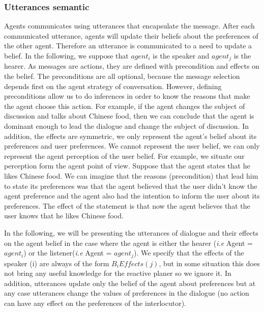 \documentclass{llncs}
\begin{document}

\subsubsection{Utterances semantic}
Agents communicates using utterances that encapsulate the message. After each communicated utterance, agents will update their beliefs about the preferences of the other agent. Therefore an utterance is communicated to a need to update a belief. In the following, we suppose that $agent_{i}$ is the speaker and $agent_{j}$ is the hearer. As messages are actions, they are defined with precondition and effects on the belief. The preconditions are all optional, because the message selection depends first on the agent strategy of conversation. However, defining preconditions allow us to do inferences in order to know the reasons that make the agent choose this action. For example, if the agent changes the subject of discussion and talks about Chinese food, then we can conclude that the agent is dominant enough to lead the dialogue and change the subject of discussion. In addition, the effects are symmetric, we only represent the  agent's belief about its preferences and user preferences. We cannot represent the user belief, we can only represent the agent perception of the user belief. For example, we situate our perception form the agent point of view. Suppose that the agent states that he likes Chinese food.  We can imagine that the reasons (precondition) that lead him  to state its preferences was that the agent believed that the user didn't know the agent preference and the agent also had the intention to inform the user about its preferences. The effect of the statement is that now the agent believes that the user knows that he likes Chinese food. 

In the following, we will be presenting  the utterances of dialogue and their effects on the agent belief in the case where the agent is either the hearer (\textit{i.e} Agent = $agent_i$) or  the listener(\textit{i.e} Agent = $agent_j$). We specify that the effects of the speaker (i)  are always of the form $B_i Effects(j)$, but in some situation this does not bring any useful knowledge for the reactive planer so we ignore it. In addition, utterances update only the belief of the agent about preferences but at any case utterances change the values of preferences in the dialogue (no action can have any effect on the preferences of the interlocutor). 
\end{document}
